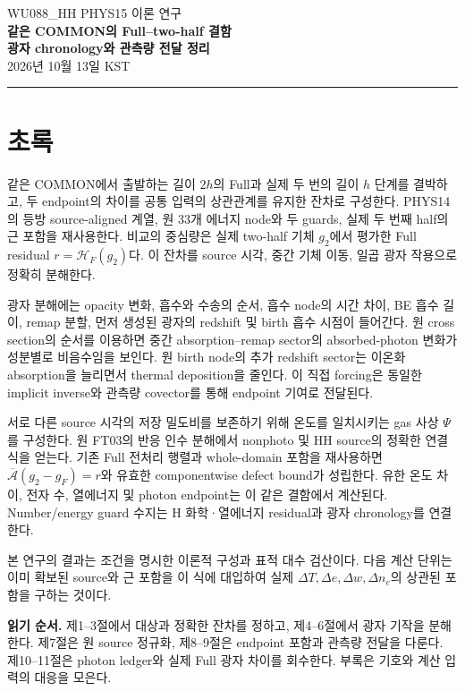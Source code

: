 \documentclass[11pt,a4paper]{article}
\newcommand{\HF}{\mathcal H_F}
\theoremstyle{definition}
\begin{document}
\begin{center}
{\color{MidnightBlue}\sffamily\large WU088\_HH \quad PHYS15 이론 연구}\\[5mm]
{\LARGE\bfseries 같은 COMMON의 Full--two-half 결함}\\[2mm]
{\Large\bfseries 광자 chronology와 관측량 전달 정리}\\[4mm]
{\large 2026년 10월 13일 KST}
\end{center}
\vspace{2mm}
\noindent\rule{\textwidth}{0.6pt}

\section*{초록}
같은 COMMON에서 출발하는 길이 $2h$의 Full과 실제 두 번의 길이 $h$ 단계를 결박하고, 두 endpoint의 차이를 공통 입력의 상관관계를 유지한 잔차로 구성한다. PHYS14의 등방 source-aligned 계열, 원 33개 에너지 node와 두 guards, 실제 두 번째 half의 근 포함을 재사용한다. 비교의 중심량은 실제 two-half 기체 $g_2$에서 평가한 Full residual $r=\HF(g_2)$다. 이 잔차를 source 시각, 중간 기체 이동, 일곱 광자 작용으로 정확히 분해한다.

광자 분해에는 opacity 변화, 흡수와 수송의 순서, 흡수 node의 시간 차이, BE 흡수 길이, remap 분할, 먼저 생성된 광자의 redshift 및 birth 흡수 시점이 들어간다. 원 cross section의 순서를 이용하면 중간 absorption--remap sector의 absorbed-photon 변화가 성분별로 비음수임을 보인다. 원 birth node의 추가 redshift sector는 이온화 absorption을 늘리면서 thermal deposition을 줄인다. 이 직접 forcing은 동일한 implicit inverse와 관측량 covector를 통해 endpoint 기여로 전달된다.

서로 다른 source 시각의 저장 밀도비를 보존하기 위해 온도를 일치시키는 gas 사상 $\Psi$를 구성한다. 원 FT03의 반응 인수 분해에서 nonphoto 및 HH source의 정확한 연결식을 얻는다. 기존 Full 전처리 행렬과 whole-domain 포함을 재사용하면 $\overline{\mathcal A}(g_2-g_F)=r$와 유효한 componentwise defect bound가 성립한다. 유한 온도 차이, 전자 수, 열에너지 및 photon endpoint는 이 같은 결함에서 계산된다. Number/energy guard 수지는 H 화학·열에너지 residual과 광자 chronology를 연결한다.

본 연구의 결과는 조건을 명시한 이론적 구성과 표적 대수 검산이다. 다음 계산 단위는 이미 확보된 source와 근 포함을 이 식에 대입하여 실제 $\Delta T,\Delta e,\Delta w,\Delta n_e$의 상관된 포함을 구하는 것이다.\cite{phys14,root_theory,photon_theory,bindings}

\vspace{1mm}
\noindent{}
\newpage
\begingroup
\small\setlength{\parskip}{0pt}
\tableofcontents
\vspace{3mm}
\noindent\textbf{읽기 순서.} 제1--3절에서 대상과 정확한 잔차를 정하고, 제4--6절에서 광자 기작을 분해한다. 제7절은 원 source 정규화, 제8--9절은 endpoint 포함과 관측량 전달을 다룬다. 제10--11절은 photon ledger와 실제 Full 광자 차이를 회수한다. 부록은 기호와 계산 입력의 대응을 모은다.
\endgroup
\newpage



\end{document}
